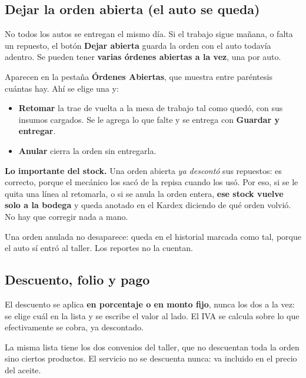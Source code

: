 \documentclass[11pt,a4paper]{article}
\begin{document}
\subsection{Dejar la orden abierta (el auto se queda)}


No todos los autos se entregan el mismo día. Si el trabajo sigue mañana, o falta
un repuesto, el botón \textbf{Dejar abierta} guarda la orden con el auto todavía
adentro. Se pueden tener \textbf{varias órdenes abiertas a la vez}, una por auto.

Aparecen en la pestaña \textbf{Órdenes Abiertas}, que muestra entre paréntesis
cuántas hay. Ahí se elige una y:

\begin{itemize}
  \item \textbf{Retomar} la trae de vuelta a la mesa de trabajo tal como quedó,
        con sus insumos cargados. Se le agrega lo que falte y se entrega con
        \textbf{Guardar y entregar}.
  \item \textbf{Anular} cierra la orden sin entregarla.
\end{itemize}

\textbf{Lo importante del stock.} Una orden abierta \emph{ya descontó} sus
repuestos: es correcto, porque el mecánico los sacó de la repisa cuando los usó.
Por eso, si se le quita una línea al retomarla, o si se anula la orden entera,
\textbf{ese stock vuelve solo a la bodega} y queda anotado en el Kardex diciendo
de qué orden volvió. No hay que corregir nada a mano.

Una orden anulada no desaparece: queda en el historial marcada como tal, porque
el auto sí entró al taller. Los reportes no la cuentan.

\subsection{Descuento, folio y pago}

El descuento se aplica \textbf{en porcentaje o en monto fijo}, nunca los dos a
la vez: se elige cuál en la lista y se escribe el valor al lado. El IVA se
calcula sobre lo que efectivamente se cobra, ya descontado.

La misma lista tiene los dos convenios del taller, que no descuentan toda la
orden sino ciertos productos. El servicio no se descuenta nunca: va incluido en
el precio del aceite.
\end{document}
